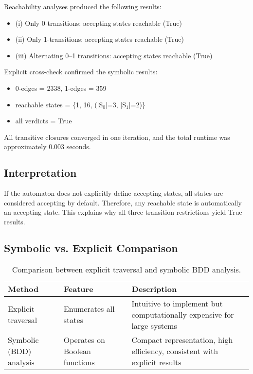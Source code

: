 \documentclass[a4paper,11pt]{article}
\begin{document}
Reachability analyses produced the following results:

\begin{itemize}
  \item (i) Only 0-transitions: accepting states reachable (True)
  \item (ii) Only 1-transitions: accepting states reachable (True)
  \item (iii) Alternating 0–1 transitions: accepting states reachable (True)
\end{itemize}

Explicit cross-check confirmed the symbolic results:
\begin{itemize}
  \item 0-edges = 2338, 1-edges = 359
  \item reachable states = \{1, 16, (|S$_0$|=3, |S$_1$|=2)\}
  \item all verdicts = True
\end{itemize}

All transitive closures converged in one iteration,
and the total runtime was approximately 0.003 seconds.



\subsection*{Interpretation}

If the automaton does not explicitly define accepting states,
all states are considered accepting by default.
Therefore, any reachable state is automatically an accepting state.
This explains why all three transition restrictions yield True results.



\subsection*{Symbolic vs. Explicit Comparison}

\begin{table}[h]
\centering
\begin{tabular}{l|l|p{7cm}}
\textbf{Method} & \textbf{Feature} & \textbf{Description} \\\hline
Explicit traversal & Enumerates all states & Intuitive to implement but computationally expensive for large systems \\
Symbolic (BDD) analysis & Operates on Boolean functions & Compact representation, high efficiency, consistent with explicit results \\
\end{tabular}
\caption{Comparison between explicit traversal and symbolic BDD analysis.}
\end{table}
\end{document}
